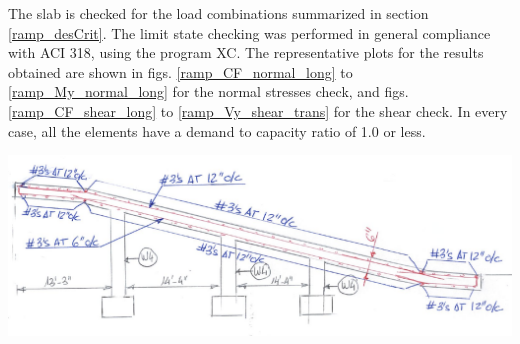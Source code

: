 The slab is checked for the load combinations summarized in section \ref{ramp_desCrit}. The limit state checking was performed in general compliance with ACI 318, using the program XC. The representative plots for the results obtained are shown in figs. \ref{ramp_CF_normal_long} to \ref{ramp_My_normal_long} for the normal stresses check, and figs. \ref{ramp_CF_shear_long} to \ref{ramp_Vy_shear_trans} for the shear check.
In every case, all the elements have a demand to capacity ratio of 1.0 or less.
\begin{Figure}
    \includegraphics[width=\linewidth]{ramp/figures/ramp_reinf}
    \label{ramp_reinf}
\end{Figure}

